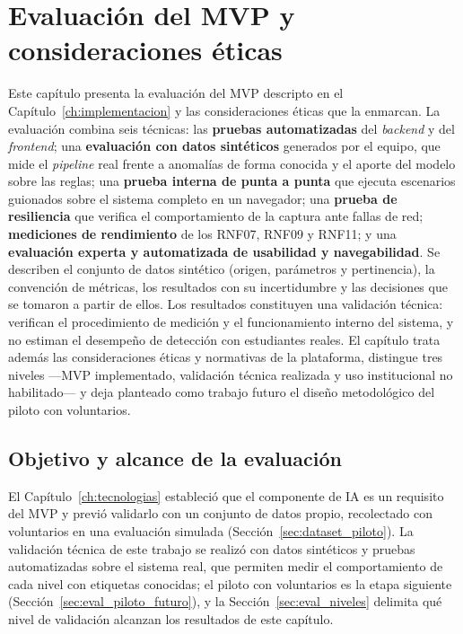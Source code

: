 \chapter{Evaluación del MVP y consideraciones éticas}
\label{ch:evaluacion}
\label{ch:piloto}
\begingroup\sloppy
\let\EvalOrigUnderscore\_
\renewcommand{\_}{\EvalOrigUnderscore\allowbreak}

\begin{chapterabstract}
Este capítulo presenta la evaluación del MVP descripto en el Capítulo~\ref{ch:implementacion} y las consideraciones éticas que la enmarcan. La evaluación combina seis técnicas: las \textbf{pruebas automatizadas} del \textit{backend} y del \textit{frontend}; una \textbf{evaluación con datos sintéticos} generados por el equipo, que mide el \textit{pipeline} real frente a anomalías de forma conocida y el aporte del modelo sobre las reglas; una \textbf{prueba interna de punta a punta} que ejecuta escenarios guionados sobre el sistema completo en un navegador; una \textbf{prueba de resiliencia} que verifica el comportamiento de la captura ante fallas de red; \textbf{mediciones de rendimiento} de los RNF07, RNF09 y RNF11; y una \textbf{evaluación experta y automatizada de usabilidad y navegabilidad}. Se describen el conjunto de datos sintético (origen, parámetros y pertinencia), la convención de métricas, los resultados con su incertidumbre y las decisiones que se tomaron a partir de ellos. Los resultados constituyen una validación técnica: verifican el procedimiento de medición y el funcionamiento interno del sistema, y no estiman el desempeño de detección con estudiantes reales. El capítulo trata además las consideraciones éticas y normativas de la plataforma, distingue tres niveles ---MVP implementado, validación técnica realizada y uso institucional no habilitado--- y deja planteado como trabajo futuro el diseño metodológico del piloto con voluntarios.
\end{chapterabstract}

\section{Objetivo y alcance de la evaluación}
\label{sec:eval_objetivo}

El Capítulo~\ref{ch:tecnologias} estableció que el componente de IA es un requisito del MVP y previó validarlo con un conjunto de datos propio, recolectado con voluntarios en una evaluación simulada (Sección~\ref{sec:dataset_piloto}). La validación técnica de este trabajo se realizó con datos sintéticos y pruebas automatizadas sobre el sistema real, que permiten medir el comportamiento de cada nivel con etiquetas conocidas; el piloto con voluntarios es la etapa siguiente (Sección~\ref{sec:eval_piloto_futuro}), y la Sección~\ref{sec:eval_niveles} delimita qué nivel de validación alcanzan los resultados de este capítulo.

